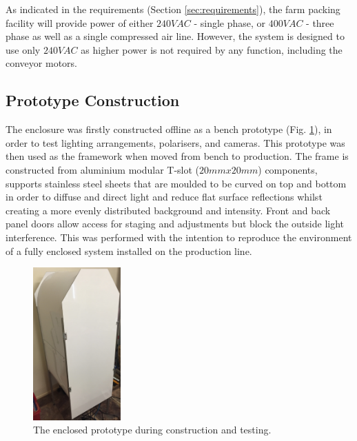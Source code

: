 \documentclass[fleqn,twoside,12pt]{report}
\begin{document}
As indicated in the requirements (Section \ref{sec:requirements}), the farm packing facility will provide power of either $240VAC$ - single phase, or $400VAC$ - three phase as well as a single compressed air line. However, the system is designed to use only $240VAC$ as higher power is not required by any function, including the conveyor motors.


\subsection{Prototype Construction}
\label{sec:prototype_contruct}


The enclosure was firstly constructed offline as a bench prototype (Fig. \ref{fig:bench_construct}), in order to test lighting arrangements, polarisers, and cameras. This prototype was then used as the framework when moved from bench to production. The frame is constructed from aluminium modular T-slot ($20mmx20mm$) components, supports stainless steel sheets that are moulded to be curved on top and bottom in order to diffuse and direct light and reduce flat surface reflections whilst creating a more evenly distributed background and intensity. Front and back panel doors allow access for staging and adjustments but block the outside light interference. This was performed with the intention to reproduce the environment of a fully enclosed system installed on the production line. 

\begin{figure}
	\begin{center}
		\includegraphics[width=0.3\textwidth]{images/bench_construct.jpg}
	\end{center}
	\caption{The enclosed prototype during construction and testing.}
	\label{fig:bench_construct}
\end{figure} 
\end{document}
